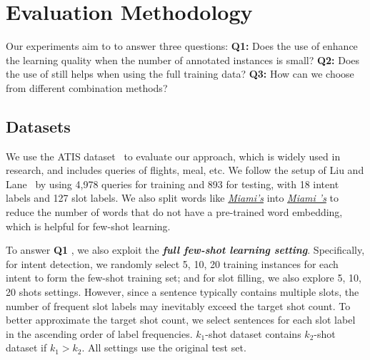 \section{Evaluation Methodology}
Our experiments
aim to %
to answer three questions: \textbf{Q1:} Does the use of \REs enhance the learning quality when the number of annotated
instances is small?  \textbf{Q2:}  Does the use of \REs still helps when using the full training data?
 \textbf{Q3:}  How can we choose from different combination methods?

\subsection{Datasets}
\label{sec_datasest}

We use the ATIS dataset~\cite{hemphill1990atis} to evaluate our approach, which is widely used in \SLU research, and
includes queries of flights, meal, etc. We follow the setup of Liu and Lane~ by using 4,978 queries for training and 893 for
testing, with 18 intent labels and 127 slot labels.
We also split words like
\textsl{\underline{Miami's}} into \textsl{\underline{Miami 's}} to reduce the number of words that do not have a pre-trained word
embedding, which is helpful for few-shot learning.

To answer  \textbf{Q1} , we also exploit the \textbf{\emph{full few-shot learning setting}}. Specifically, for intent detection, we randomly
select 5, 10, 20 training instances for each intent to form the few-shot training set; and for slot filling, we also explore 5, 10, 20
shots settings. However, since a sentence typically contains multiple slots, the number of frequent slot labels may inevitably exceed
the target shot count. To better approximate the target shot count, we select sentences for each slot label  in the
ascending order of label frequencies.
$k_1$-shot dataset contains $k_2$-shot dataset if $k_1>k_2$.
All settings use the original test set.

